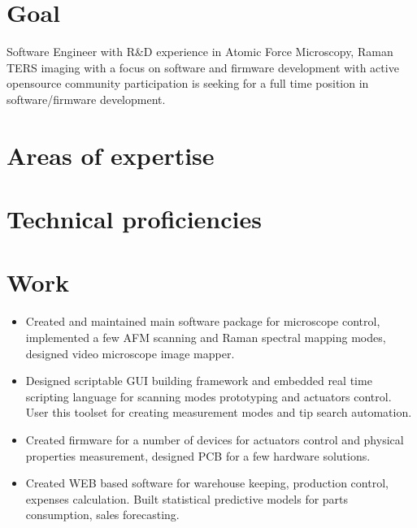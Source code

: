 \documentclass{sb_cv}
\begin{document}
\makecvtitle

\section{Goal}
Software Engineer with R\&D experience in Atomic Force Microscopy, Raman TERS imaging with a focus on software and firmware development with active opensource community participation is seeking for a full time position in software/firmware development.

\section{Areas of expertise}

\section{Technical proficiencies}

\section{Work}
\begin{itemize}
\item Created and maintained main software package for microscope control, implemented a few AFM scanning and Raman spectral mapping modes, designed video microscope image mapper.
\item Designed scriptable GUI building framework and embedded real time scripting language for scanning modes prototyping and actuators control. User this toolset for creating measurement modes and tip search automation.
\item Created firmware for a number of devices for actuators control and physical properties measurement, designed PCB for a few hardware solutions.
\item Created WEB based software for warehouse keeping, production control, expenses calculation. Built statistical predictive models for parts consumption, sales forecasting.
\end{itemize}
\end{document}
